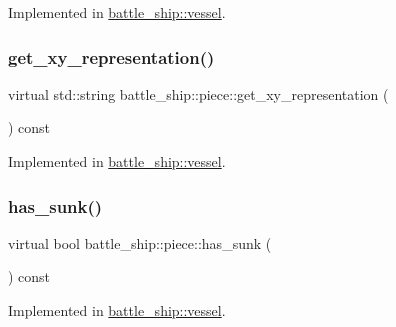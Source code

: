 Implemented in \hyperlink{classbattle__ship_1_1vessel_a84716baaafee9839292f67b03abc7272}{battle\+\_\+ship\+::vessel}.

\mbox{\label{classbattle__ship_1_1piece_ad589faff3ce07b5130bfdd89da4269c1}} 
\subsubsection{\texorpdfstring{get\+\_\+xy\+\_\+representation()}{get\_xy\_representation()}}
{\footnotesize\ttfamily virtual std\+::string battle\+\_\+ship\+::piece\+::get\+\_\+xy\+\_\+representation (\begin{DoxyParamCaption}{ }\end{DoxyParamCaption}) const\hspace{0.3cm}{\ttfamily [pure virtual]}}



Implemented in \hyperlink{classbattle__ship_1_1vessel_a84bfaba9be4f15f6ec934c925d11967d}{battle\+\_\+ship\+::vessel}.

\mbox{\label{classbattle__ship_1_1piece_af22bd781f4206decd0beed89b014d1cc}} 
\subsubsection{\texorpdfstring{has\+\_\+sunk()}{has\_sunk()}}
{\footnotesize\ttfamily virtual bool battle\+\_\+ship\+::piece\+::has\+\_\+sunk (\begin{DoxyParamCaption}{ }\end{DoxyParamCaption}) const\hspace{0.3cm}{\ttfamily [pure virtual]}}



Implemented in \hyperlink{classbattle__ship_1_1vessel_a5f36d687fbb87ced436d2d88847a1d5c}{battle\+\_\+ship\+::vessel}.

\mbox{\label{classbattle__ship_1_1piece_a052305c855625732d3e5ba96d0fca5f9}} 
